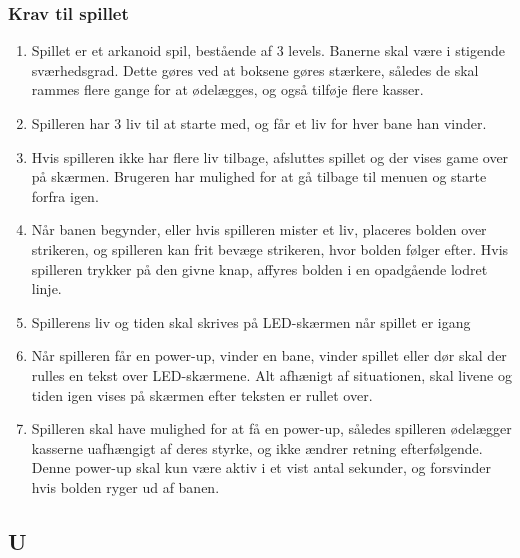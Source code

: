 \subsubsection{Krav til spillet}
\begin{enumerate}
\item Spillet er et arkanoid spil, bestående af 3 levels. Banerne skal være i stigende sværhedsgrad. Dette gøres ved at boksene gøres stærkere, således de skal rammes flere gange for at ødelægges, og også tilføje flere kasser.
\item Spilleren har 3 liv til at starte med, og får et liv for hver bane han vinder.
\item Hvis spilleren ikke har flere liv tilbage, afsluttes spillet og der vises game over på skærmen. Brugeren har mulighed for at gå tilbage til menuen og starte forfra igen.
\item Når banen begynder, eller hvis spilleren mister et liv, placeres bolden over strikeren, og spilleren kan frit bevæge strikeren, hvor bolden følger efter. Hvis spilleren trykker på den givne knap, affyres bolden i en opadgående lodret linje. 
\item Spillerens liv og tiden skal skrives på LED-skærmen når spillet er igang
\item Når spilleren får en power-up, vinder en bane, vinder spillet eller dør skal der rulles en tekst over LED-skærmene. Alt afhænigt af situationen, skal livene og tiden igen vises på skærmen efter teksten er rullet over.
\item Spilleren skal have mulighed for at få en power-up, således spilleren ødelægger kasserne uafhængigt af deres styrke, og ikke ændrer retning efterfølgende. Denne power-up skal kun være aktiv i et vist antal sekunder, og forsvinder hvis bolden ryger ud af banen.
\end{enumerate}

\subsection{U}